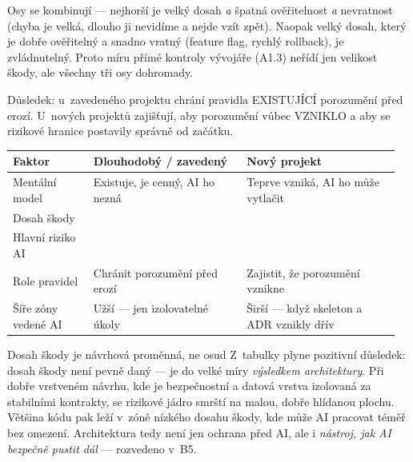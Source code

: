 \begin{calloutplain}[amber]
Osy se kombinují --- nejhorší je velký dosah \emph{a} špatná ověřitelnost \emph{a} nevratnost (chyba je velká, dlouho ji nevidíme a nejde vzít zpět).
Naopak velký dosah, který je dobře ověřitelný a snadno vratný (feature flag, rychlý rollback), je zvládnutelný.
Proto míru přímé kontroly vývojáře (A1.3) neřídí jen velikost škody, ale všechny tři osy dohromady.
\end{calloutplain}

\begin{calloutplain}[grey]
Důsledek: u~zavedeného projektu chrání pravidla EXISTUJÍCÍ porozumění před erozí.
U~nových projektů zajišťují, aby porozumění vůbec VZNIKLO a aby se rizikové hranice postavily správně od začátku.
\end{calloutplain}

\medskip
\noindent
\begin{tabularx}{\linewidth}{L{0.20\linewidth} L{0.38\linewidth} L{0.38\linewidth}}
\toprule
{}
{\color{white}\textbf{Faktor}} & {\color{white}\textbf{Dlouhodobý / zavedený}} & {\color{white}\textbf{Nový projekt}} \\
\midrule
Mentální model & Existuje, je cenný, AI ho nezná & Teprve vzniká, AI ho může vytlačit \\
Dosah škody &  &  \\
Hlavní riziko AI &  &  \\
Role pravidel & Chránit porozumění před erozí & Zajistit, že porozumění vznikne \\
Šíře zóny vedené AI & Užší --- jen izolovatelné úkoly & Širší --- když skeleton a ADR vznikly dřív \\
\bottomrule
\end{tabularx}

\medskip
\begin{callout}[green]{Dosah škody je návrhová proměnná, ne osud}
Z~tabulky plyne pozitivní důsledek: dosah škody není pevně daný --- je do velké míry \emph{výsledkem architektury}.
Při dobře vrstveném návrhu, kde je bezpečnostní a datová vrstva izolovaná za stabilními kontrakty, se rizikové jádro smrští na malou, dobře hlídanou plochu.
Většina kódu pak leží v~zóně nízkého dosahu škody, kde může AI pracovat téměř bez omezení.
Architektura tedy není jen ochrana před AI, ale i \emph{nástroj, jak AI bezpečně pustit dál} --- rozvedeno v~B5.
\end{callout}

